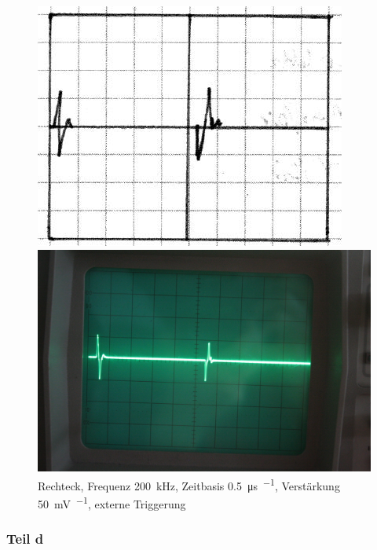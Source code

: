 \begin{figure}[htbp]
	\centering
	\begin{minipage}{.45\linewidth}
	\includegraphics[width=\linewidth]{Skizzen/IMG_0768-1500.jpg}
	\end{minipage}
	\hfill
	\begin{minipage}{.45\linewidth}
	\includegraphics[width=\linewidth]{Fotos/IMG_0768-1500.jpg}
	\end{minipage}
	\caption{%
		Rechteck, Frequenz \SI{200}{\kilo\hertz},
		Zeitbasis \SI{.5}{\micro\second\per\division},
		Verstärkung \SI{50}{\milli\volt\per\division},
		externe Triggerung
	}
	\label{fig:0768}
\end{figure}

\FloatBarrier
\subsubsection{Teil d}

